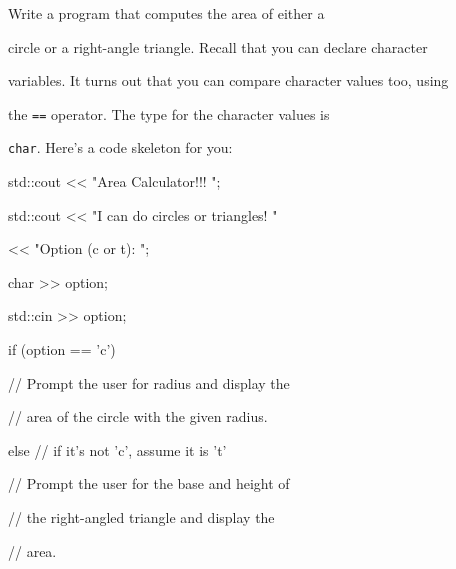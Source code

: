 Write a program that computes the area of either a

circle or a right-angle triangle. Recall that you can declare character

variables. It turns out that you can compare character values too, using

the \texttt{==} operator. The type for the character values is

\texttt{char}. Here's a code skeleton for you:

\begin{console}

std::cout << "Area Calculator!!! \n";

std::cout << "I can do circles or triangles! \n"

          << "Option (c or t): ";

char >> option;

std::cin >> option;

if (option == 'c')

{

        // Prompt the user for radius and display the

        // area of the circle with the given radius.

}

else    // if it's not 'c', assume it is 't'

{

        // Prompt the user for the base and height of

        // the right-angled triangle and display the

        // area.

}

\end{console}

